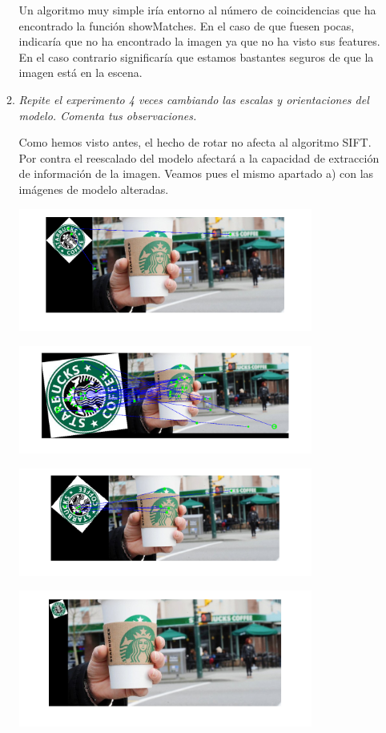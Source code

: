 \documentclass{article}
\begin{document}
\begin{enumerate}
\begin{enumerate}
Un algoritmo muy simple iría entorno al número de coincidencias que ha encontrado la función showMatches. En el caso de que fuesen pocas, indicaría que no ha encontrado la imagen ya que no ha visto sus features. En el caso contrario significaría que estamos bastantes seguros de que la imagen está en la escena.

 \item \textit {Repite el experimento 4 veces cambiando las escalas y orientaciones del 
modelo. Comenta tus observaciones.}
 
 Como hemos visto antes, el hecho de rotar no afecta al algoritmo SIFT. Por contra el reescalado del modelo afectará a la capacidad de extracción de información de la imagen. Veamos pues el mismo apartado a) con las imágenes de modelo alteradas.
 
 \begin{center}
 	\includegraphics[width=0.8\textwidth]{ej35d1.png}
 \end{center}
\begin{center}
	\includegraphics[width=0.8\textwidth]{ej35d2.png}
\end{center}
\begin{center}
	\includegraphics[width=0.8\textwidth]{ej35d3.png}
\end{center}
\begin{center}
	\includegraphics[width=0.8\textwidth]{ej35d4.png}
\end{center}
 

\end{enumerate}
\end{enumerate}
\end{document}

